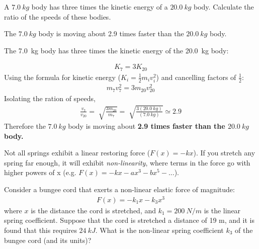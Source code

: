 


\question A $\SI{7.0}{kg}$ body has three times the kinetic energy of a $\SI{20.0}{kg}$ body. Calculate the ratio of the speeds of these bodies.

\begin{finalanswer}
The $\SI{7.0}{kg}$ body is moving about 2.9 times faster than the $\SI{20.0}{kg}$ body.
\end{finalanswer}


\begin{solution}
The \SI{7.0}{kg} body has three times the kinetic energy of the \SI{20.0}{kg} body:

\begin{align*}
K_7 = 3 K_{20}
\end{align*}
Using the formula for kinetic energy ($K_i=\frac{1}{2} m_i v_i^2$) and cancelling factors of $\frac{1}{2}$:
\begin{align*}
m_7 v_7^2 = 3 m_{20} v_{20}^2
\end{align*}
Isolating the ration of speeds,
\begin{align*}
\frac{v_7}{v_{20}} = \sqrt[]{\frac{3 m_{20}}{m_7}} = \sqrt[]{\frac{3 (\SI{20.0}{kg})}{(\SI{7.0}{kg})}}   \simeq \mathbf{2.9}
\end{align*}
Therefore the $\SI{7.0}{kg}$ body is moving about \bf{2.9 times faster} than the $\SI{20.0}{kg}$ body.
\end{solution}

\question Not all springs exhibit a linear restoring force ($F(x)=-kx$). If you stretch any spring far enough, it will exhibit \textit{non-linearity}, where terms in the force go with higher powers of x (e.g. $F(x)= - kx - a x^3 - b x^5 - ...$).

Consider a bungee cord that exerts a non-linear elastic force of magnitude:
\begin{align*}
F(x)=-k_1 x-k_3 x^3
\end{align*}
where $x$ is the distance the cord is stretched, and $k_1=\SI{200}{N/m}$ is the linear spring coefficient. Suppose that the cord is stretched a distance of 19 m, and it is found that this requires $\SI{24}{kJ}$.  What is the non-linear spring coefficient $k_3$ of the bungee cord (and its units)? 

